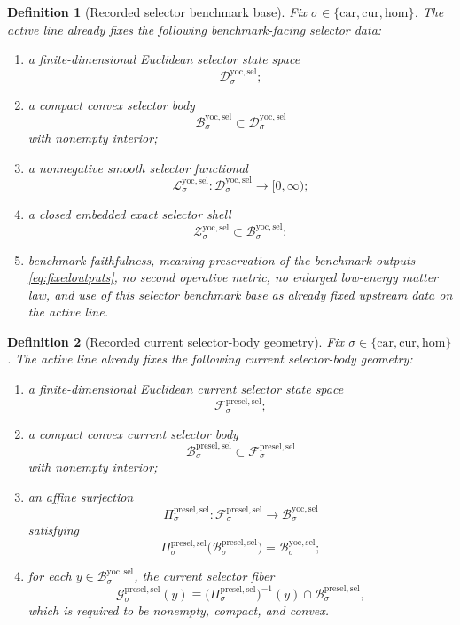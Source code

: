 \documentclass[11pt]{article}
\newcommand{\Car}{\mathrm{car}}
\newcommand{\Cur}{\mathrm{cur}}
\newcommand{\Hom}{\mathrm{hom}}
\newcommand{\YoctoSelectorSpace}[1]{\mathcal D_{#1}^{\mathrm{yoc,sel}}}
\newcommand{\YoctoSelectorBody}[1]{\mathcal B_{#1}^{\mathrm{yoc,sel}}}
\newcommand{\YoctoSelectorFunctional}[1]{\mathscr L_{#1}^{\mathrm{yoc,sel}}}
\newcommand{\YoctoSelectorShell}[1]{\mathcal Z_{#1}^{\mathrm{yoc,sel}}}
\newcommand{\PreSectionSelectorSpace}[1]{\mathcal F_{#1}^{\mathrm{presel,sel}}}
\newcommand{\PreSectionSelectorBody}[1]{\mathcal B_{#1}^{\mathrm{presel,sel}}}
\newcommand{\PreSectionSelectorProj}[1]{\Pi_{#1}^{\mathrm{presel,sel}}}
\newcommand{\PreSectionSelectorFiber}[2]{\mathcal G_{#1}^{\mathrm{presel,sel}}(#2)}
\newtheorem{definition}{Definition}
\begin{document}
\begin{definition}[Recorded selector benchmark base]
\label{def:selectorbase}
Fix \(\sigma\in\{\Car,\Cur,\Hom\}\). The active line already fixes the following benchmark-facing selector data:
\begin{enumerate}
    \item a finite-dimensional Euclidean selector state space
    \[
    \YoctoSelectorSpace{\sigma};
    \]
    \item a compact convex selector body
    \[
    \YoctoSelectorBody{\sigma}\subset\YoctoSelectorSpace{\sigma}
    \]
    with nonempty interior;
    \item a nonnegative smooth selector functional
    \[
    \YoctoSelectorFunctional{\sigma}:\YoctoSelectorSpace{\sigma}\to[0,\infty);
    \]
    \item a closed embedded exact selector shell
    \[
    \YoctoSelectorShell{\sigma}\subset\YoctoSelectorBody{\sigma};
    \]
    \item benchmark faithfulness, meaning preservation of the benchmark outputs \eqref{eq:fixedoutputs}, no second operative metric, no enlarged low-energy matter law, and use of this selector benchmark base as already fixed upstream data on the active line.
\end{enumerate}
\end{definition}

\begin{definition}[Recorded current selector-body geometry]
\label{def:geometry}
Fix \(\sigma\in\{\Car,\Cur,\Hom\}\). The active line already fixes the following current selector-body geometry:
\begin{enumerate}
    \item a finite-dimensional Euclidean current selector state space
    \[
    \PreSectionSelectorSpace{\sigma};
    \]
    \item a compact convex current selector body
    \[
    \PreSectionSelectorBody{\sigma}\subset\PreSectionSelectorSpace{\sigma}
    \]
    with nonempty interior;
    \item an affine surjection
    \[
    \PreSectionSelectorProj{\sigma}:\PreSectionSelectorSpace{\sigma}\to\YoctoSelectorBody{\sigma}
    \]
    satisfying
    \[
    \PreSectionSelectorProj{\sigma}\bigl(\PreSectionSelectorBody{\sigma}\bigr)
    =
    \YoctoSelectorBody{\sigma};
    \]
    \item for each \(y\in\YoctoSelectorBody{\sigma}\), the current selector fiber
    \[
    \PreSectionSelectorFiber{\sigma}{y}
    \equiv
    \bigl(\PreSectionSelectorProj{\sigma}\bigr)^{-1}(y)\cap\PreSectionSelectorBody{\sigma},
    \]
    which is required to be nonempty, compact, and convex.
\end{enumerate}
\end{definition}
\end{document}
